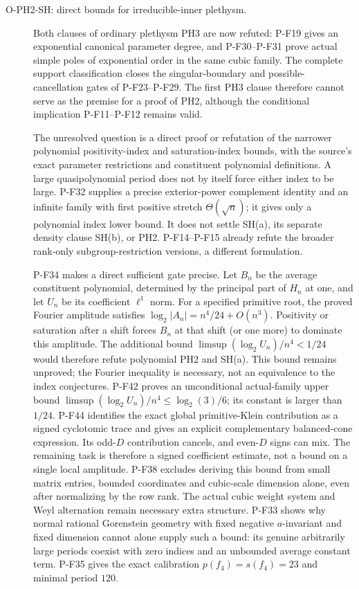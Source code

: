 \documentclass[11pt,a4paper]{article}
\begin{document}
\begin{description}
\item[O-PH2-SH: direct bounds for irreducible-inner plethysm.]
Both clauses of ordinary plethysm PH3 are now refuted: P-F19 gives
an exponential canonical parameter degree, and P-F30--P-F31 prove
actual simple poles of exponential order in the same cubic family.
The complete support classification closes the singular-boundary
and possible-cancellation gates of P-F23--P-F29. The first PH3
clause therefore cannot serve as the premise for a proof of PH2,
although the conditional implication P-F11--P-F12 remains valid.

The unresolved question is a direct proof or refutation of the
narrower polynomial positivity-index and saturation-index bounds,
with the source's exact parameter restrictions and constituent
polynomial definitions. A large quasipolynomial period does not by
itself force either index to be large. P-F32 supplies a precise
exterior-power complement identity and an infinite family with
first positive stretch $\Theta(\sqrt n)$; it gives only a polynomial
index lower bound. It does not settle SH(a), its separate density
clause SH(b), or PH2. P-F14--P-F15 already refute the broader
rank-only subgroup-restriction versions, a different formulation.

P-F34 makes a direct sufficient gate precise. Let $B_n$ be the
average constituent polynomial, determined by the principal part
of $H_n$ at one, and let $U_n$ be its coefficient $\ell^1$ norm.
For a specified primitive root, the proved Fourier amplitude satisfies
$\log_2|A_n|=n^4/24+O(n^3)$. Positivity or saturation
after a shift forces $B_n$ at that shift (or one more) to dominate
this amplitude. The additional bound
$\limsup (\log_2 U_n)/n^4<1/24$ would therefore refute polynomial
PH2 and SH(a). This bound remains unproved; the Fourier inequality
is necessary, not an equivalence to the index conjectures.
P-F42 proves an unconditional actual-family upper bound
$\limsup(\log_2 U_n)/n^4\le\log_2(3)/6$; its constant
is larger than $1/24$. P-F44 identifies the exact global
primitive-Klein contribution as a signed cyclotomic trace and
gives an explicit complementary balanced-cone expression.
Its odd-$D$ contribution cancels, and even-$D$ signs can mix.
The remaining task is therefore a signed coefficient estimate,
not a bound on a single local amplitude.
P-F38 excludes deriving this bound from small matrix entries, bounded
coordinates and cubic-scale dimension alone, even after normalizing by
the row rank. The actual cubic weight system and Weyl alternation remain
necessary extra structure. P-F33 shows why normal rational Gorenstein geometry with fixed
negative $a$-invariant and fixed dimension cannot alone supply
such a bound: its genuine arbitrarily large periods coexist with
zero indices and an unbounded average constant term. P-F35 gives
the exact calibration $p(f_4)=s(f_4)=23$ and minimal period $120$.


\end{description}
\end{document}
